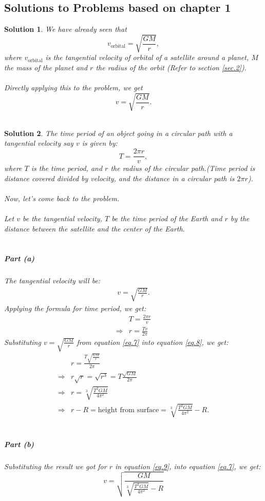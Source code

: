 \documentclass[a4paper]{report}
\newtheorem{solution}{Solution}
\begin{document}
\subsection{Solutions to Problems based on chapter 1}
\begin{solution} \normalfont
We have already seen that $$v_{\text{orbital}}=\sqrt{\frac{GM}{r}},$$ where 
$v_{\text{orbital}}$ is the tangential velocity of orbital of a satellite around a planet, $M$ the mass of the 
planet and $r$ the radius of the orbit (Refer to section \ref{sec.2}). \\\\
Directly applying this to the problem, we get $$\boxed{v=\sqrt{\frac{GM}{r}}}.$$\\
\end{solution}
\begin{solution} \normalfont
The time period of an object going in a circular path with a tangential velocity say $v$
is given by: $$T=\frac{2\pi r}{v},$$ where $T$ is the time period, and $r$ the radius of the circular path.(Time
period is distance covered divided by velocity, and the distance in a circular path is $2\pi r$).\\\\
Now, let's come back to the problem.\\\\ 
Let $v$ be the tangential velocity, $T$ be the time period of the Earth and $r$ by the distance between the 
satellite and the center of the Earth.\\\\
\subparagraph*{Part (a)} 
The tangential velocity will be: 
\begin{align}\label{eq.7}
  {v=\sqrt{\frac{GM}{r}}}.
\end{align}
Applying the formula for time period, we get: 
\begin{equation}\label{eq.8}
  \begin{split}
    &T=\frac{2\pi r}{v}\\
    \Rightarrow & r=\frac{Tv}{2\pi}
  \end{split}
\end{equation}
Substituting $v=\sqrt{\frac{GM}{r}}$ from equation \ref{eq.7} into equation \ref{eq.8}, we get: 
\begin{equation}\label{eq.9}
\begin{split}
  &r=\frac{T\sqrt{\frac{GM}{r}}}{2\pi}\\
  \Rightarrow &r\sqrt{r}=\sqrt{r^3}={T\frac{\sqrt{GM}}{2\pi}}\\
  \Rightarrow & r=\sqrt[3]{\frac{T^2GM}{4\pi^2}}\\
  \Rightarrow & r-R=\text{height from surface}=\boxed{\sqrt[3]{\frac{T^2GM}{4\pi^2}}-R}.
\end{split}
\end{equation}
\\
\subparagraph*{Part (b)} 
Substituting the result we got for $r$ in equation \ref{eq.9}, into equation \ref{eq.7}, we get:
$$v=\boxed{\sqrt{\frac{GM}{\sqrt[3]{\frac{T^2GM}{4\pi^2}}-R}}}$$
\end{solution}
\end{document}
